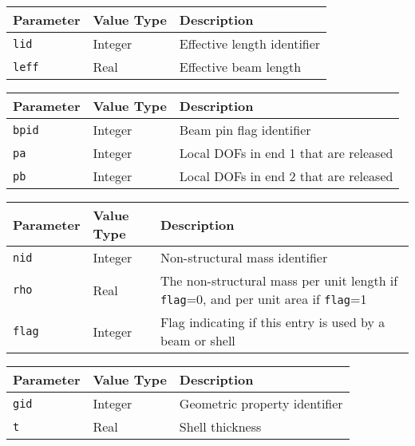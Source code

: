 
\noindent
\begin{tabular}{| m{} | m{} | m{} |}
  \hline
  \rowcolor[HTML]{EFEFEF}
  Parameter  & Value Type & Description  \\
  \hline\hline
  {\tt lid}  & Integer & Effective length identifier \\
  \hline
  {\tt leff} & Real    & Effective beam length \\
  \hline
\end{tabular}


\noindent
\begin{tabular}{| m{} | m{} | m{} |}
  \hline
  \rowcolor[HTML]{EFEFEF}
  Parameter  & Value Type & Description  \\
  \hline\hline
  {\tt bpid} & Integer & Beam pin flag identifier \\
  \hline
  {\tt pa}   & Integer & Local DOFs in end 1 that are released \\
  \hline
  {\tt pb}   & Integer & Local DOFs in end 2 that are released \\
  \hline
\end{tabular}


\noindent
\begin{tabular}{| m{} | m{} | m{} |}
  \hline
  \rowcolor[HTML]{EFEFEF}
  Parameter & Value Type & Description  \\
  \hline\hline
  {\tt nid} & Integer & Non-structural mass identifier \\
  \hline
  {\tt rho} & Real & The non-structural mass per unit length \newline
                     if {\tt flag}=0, and per unit area if {\tt flag}=1 \\
  \hline
  {\tt flag} & Integer & Flag indicating if this entry is used by a beam or shell \\
  \hline
\end{tabular}


\noindent
\begin{tabular}{| m{} | m{} | m{} |}
  \hline
  \rowcolor[HTML]{EFEFEF}
  Parameter & Value Type & Description \\
  \hline\hline
  {\tt gid} & Integer & Geometric property identifier \\
  \hline
  {\tt t} & Real & Shell thickness \\
  \hline
\end{tabular}

